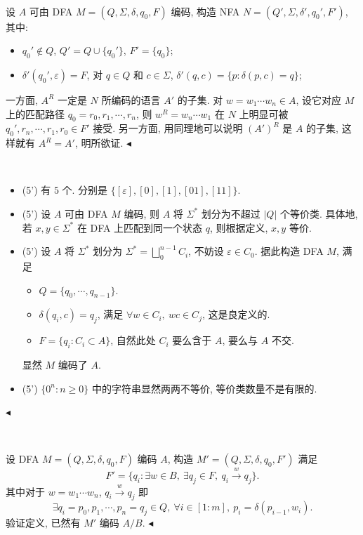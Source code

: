 ﻿\documentclass[11pt]{article}
\newenvironment{problem}[2][Problem]{\begin{trivlist}
\item[\hskip \labelsep {\bfseries #1}\hskip \labelsep {\bfseries #2.}]}{\hfill$\blacktriangleleft$\end{trivlist}}
\newcommand\eps{\varepsilon}
\begin{document}
\begin{problem}{2 (20')} ~

    \qquad 设 $A$ 可由 DFA $M=(Q,\Sigma,\delta,q_0,F)$ 编码, 构造 NFA $N=(Q',\Sigma,\delta',q_0',F')$,
    其中:
    \begin{itemize}
        \item $q_0'\notin Q$, $Q'=Q\cup\{q_0'\}$, $F'=\{q_0\}$;
        \item $\delta'(q_0',\eps)=F$, 对 $q\in Q$ 和 $c\in\Sigma$, $\delta'(q,c)=\{p:\delta(p,c)=q\}$;
    \end{itemize}

    \qquad 一方面, $A^R$ 一定是 $N$ 所编码的语言 $A'$ 的子集. 对 $w=w_1\cdots w_n\in A$, 设它对应 $M$ 上的匹配路径 $q_0=r_0,r_1,\cdots,r_n$, 则 $w^R=w_n\cdots w_1$ 在 $N$ 上明显可被 $q_0',r_n,\cdots,r_1,r_0\in F'$ 接受. 另一方面, 用同理地可以说明 $(A')^R$ 是 $A$ 的子集, 这样就有 $A^R=A'$, 明所欲证.
\end{problem}

\begin{problem}{3 (20')} ~
    \begin{itemize}
        \item[(a)] (5') 有 $5$ 个. 分别是 $\{[\eps],[0],[1],[01],[11]\}$.

        \item[(b)] (5') 设 $A$ 可由 DFA $M$ 编码, 则 $A$ 将 $\Sigma^*$ 划分为不超过 $|Q|$ 个等价类. 具体地, 若 $x,y\in\Sigma^*$ 在 DFA 上匹配到同一个状态 $q$, 则根据定义, $x,y$ 等价.

        \item[(c)] (5') 设 $A$ 将 $\Sigma^*$ 划分为 $\Sigma^*=\bigsqcup_{0}^{n-1} C_i$, 不妨设 $\eps\in C_0$. 据此构造 DFA $M$, 满足
        \begin{itemize}
            \item $Q=\{q_0,\cdots,q_{n-1}\}$.
            \item $\delta(q_i,c)=q_j$, 满足 $\forall w\in C_i,~wc\in C_j$, 这是良定义的.
            \item $F=\{q_i:C_i\subset A\}$, 自然此处 $C_i$ 要么含于 $A$, 要么与 $A$ 不交.
        \end{itemize}
        显然 $M$ 编码了 $A$.

        \item[(d)] (5') $\{0^n:n\ge 0\}$ 中的字符串显然两两不等价, 等价类数量不是有限的.
    \end{itemize}
\end{problem}

\begin{problem}{4 (20')} ~

    \qquad 设 DFA $M=(Q,\Sigma,\delta,q_0,F)$ 编码 $A$, 构造 $M'=(Q,\Sigma,\delta,q_0,F')$ 满足
    $$
        F'=\{q_i:\exists w\in B,~\exists q_j\in F,~q_i\overset{w}\to q_j\}.
    $$
    其中对于 $w=w_1\cdots w_n$, $q_i\overset{w}\to q_j$ 即
    $$
        \exists q_i=p_0,p_1,\cdots,p_n=q_j\in Q,~\forall i\in[1:m],~p_i=\delta(p_{i-1},w_i).
    $$
    验证定义, 已然有 $M'$ 编码 $A/B$.
\end{problem}
\end{document}
